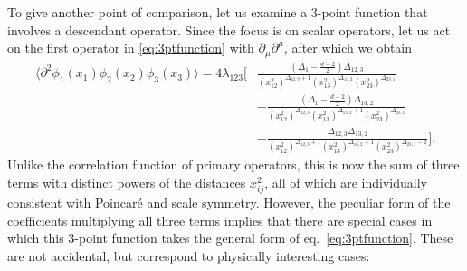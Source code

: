 \documentclass[a4paper,12pt]{article}
\numberwithin{equation}{section}
\begin{document}
To give another point of comparison, let us examine a 3-point function that involves a descendant operator. Since the focus is on scalar operators, let us act on the first operator in \eqref{eq:3ptfunction} with $\partial_\mu \partial^\mu$, after which we obtain
\begin{align}
	\langle \partial^2\phi_1(x_1) \phi_2(x_2) \phi_3(x_3) \rangle
	= 4 \lambda_{123} \bigg[ &
	\frac{\left( \Delta_1 - \frac{d-2}{2} \right) \Delta_{12,3}}
	{(x_{12}^2)^{\Delta_{12,3} + 1}
	(x_{13}^2)^{\Delta_{13,2}}
	(x_{23}^2)^{\Delta_{23,1}}}
	\nonumber \\
	& + \frac{\left( \Delta_1 - \frac{d-2}{2} \right) \Delta_{13,2}}
	{(x_{12}^2)^{\Delta_{12,3}}
	(x_{13}^2)^{\Delta_{13,2} + 1}
	(x_{23}^2)^{\Delta_{23,1}}}
	\nonumber \\
	& + \frac{\Delta_{12,3} \Delta_{13,2}}
	{(x_{12}^2)^{\Delta_{12,3} + 1}
	(x_{13}^2)^{\Delta_{13,2} + 1}
	(x_{23}^2)^{\Delta_{23,1} - 1}} \bigg].
	\label{eq:3pt:descendant}
\end{align}
Unlike the correlation function of primary operators, this is now the sum of three terms with distinct powers of the distances $x_{ij}^2$, all of which are individually consistent with Poincaré and scale symmetry.
However, the peculiar form of the coefficients multiplying all three terms implies that there are special cases in which this 3-point function takes the general form of eq.~\eqref{eq:3ptfunction}.
These are not accidental, but correspond to physically interesting cases:
\end{document}
